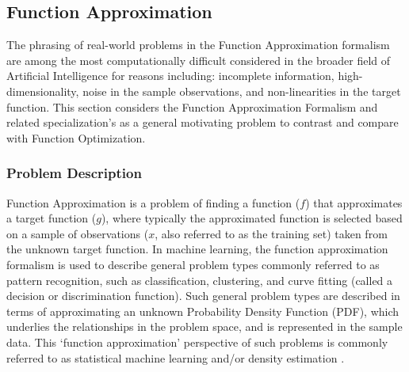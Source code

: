 \documentclass[a4paper, 11pt]{article}
\begin{document}
% 
%
\subsection{Function Approximation}
\label{subsec:function_approximation}
The phrasing of real-world problems in the Function Approximation formalism are among the most computationally difficult considered in the broader field of Artificial Intelligence for reasons including: incomplete information, high-dimensionality, noise in the sample observations, and non-linearities in the target function.
This section considers the Function Approximation Formalism and related specialization's as a general motivating problem to contrast and compare with Function Optimization.

%
%
\subsubsection{Problem Description}
Function Approximation is a problem of finding a function ($f$) that approximates a target function ($g$), where typically the approximated function is selected based on a sample of observations ($x$, also referred to as the training set) taken from the unknown target function.
In machine learning, the function approximation formalism is used to describe general problem types commonly referred to as pattern recognition, such as classification, clustering, and curve fitting (called a decision or discrimination function). Such general problem types are described in terms of approximating an unknown Probability Density Function (PDF), which underlies the relationships in the problem space, and is represented in the sample data. This `function approximation' perspective of such problems is commonly referred to as statistical machine learning and/or density estimation \cite{Fukunaga1990, Bishop1995}.

%
%
\end{document}
